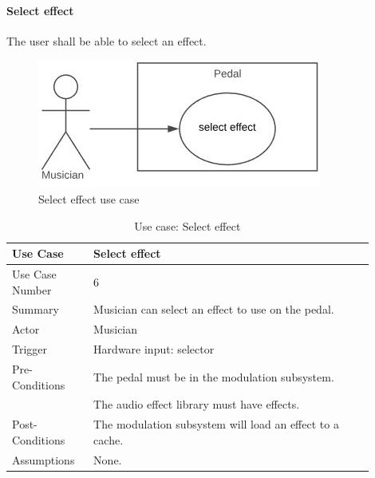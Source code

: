             \clearpage
            
            \paragraph{Select effect} 
            The user shall be able to select an effect.
            \begin{figure}[!ht]
                \centering
                \includegraphics[width=.5\textwidth]{diagrams/use_cases/uc-select-effect.JPG}
                \caption{Select effect use case}
                \label{fig:uc-select-effect}
            \end{figure}
            
            \begin{table}[!ht]
                \centering
                \begin{tabular}{| p{0.2\linewidth} | p{0.7\linewidth} |}
                    \hline
                    Use Case & Select effect \\
                    \hline \hline
                    Use Case Number & 6 \\ \hline
                    Summary & Musician can select an effect to use on the pedal. \\ \hline
                    Actor & Musician \\ \hline
                    Trigger & Hardware input: selector \\ \hline
                    Pre-Conditions & The pedal must be in the modulation subsystem. \\
                    & The audio effect library must have effects. \\ \hline
                    Post-Conditions & The modulation subsystem will load an effect to a cache. \\ \hline
                    Assumptions & None.\\ \hline
                \end{tabular}
                \\
                \caption{Use case: Select effect}
                \label{tab:uc-select-effect}
            \end{table}            
            
